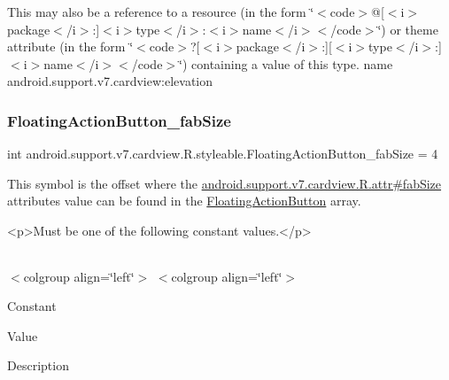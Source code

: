 This may also be a reference to a resource (in the form \char`\"{}$<$code$>$@\mbox{[}$<$i$>$package$<$/i$>$\+:\mbox{]}$<$i$>$type$<$/i$>$\+:$<$i$>$name$<$/i$>$$<$/code$>$\char`\"{}) or theme attribute (in the form \char`\"{}$<$code$>$?\mbox{[}$<$i$>$package$<$/i$>$\+:\mbox{]}\mbox{[}$<$i$>$type$<$/i$>$\+:\mbox{]}$<$i$>$name$<$/i$>$$<$/code$>$\char`\"{}) containing a value of this type.  name android.\+support.\+v7.\+cardview\+:elevation \mbox{\label{classandroid_1_1support_1_1v7_1_1cardview_1_1R_1_1styleable_affce83fe036d64bf069fab004a29b09a}} 
\subsubsection{\texorpdfstring{Floating\+Action\+Button\+\_\+fab\+Size}{FloatingActionButton\_fabSize}}
{\footnotesize\ttfamily int android.\+support.\+v7.\+cardview.\+R.\+styleable.\+Floating\+Action\+Button\+\_\+fab\+Size = 4\hspace{0.3cm}{\ttfamily [static]}}

This symbol is the offset where the \hyperlink{classandroid_1_1support_1_1v7_1_1cardview_1_1R_1_1attr_aeac4fc5173601557638982e405fe884d}{android.\+support.\+v7.\+cardview.\+R.\+attr\#fab\+Size} attribute\textquotesingle{}s value can be found in the \hyperlink{classandroid_1_1support_1_1v7_1_1cardview_1_1R_1_1styleable_a1be8c9bcabd399162362befcccf73f59}{Floating\+Action\+Button} array.

\begin{DoxyVerb}      <p>Must be one of the following constant values.</p>
\end{DoxyVerb}
 \tabulinesep=1mm
\begin{longtabu} spread 0pt [c]{*{0}{|X[-1]}|}
\hline
\end{longtabu}
$<$colgroup align=\char`\"{}left\char`\"{}$>$ $<$colgroup align=\char`\"{}left\char`\"{}$>$ 

Constant

Value

Description 

